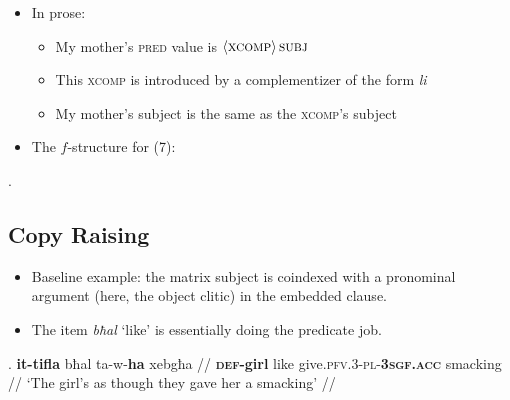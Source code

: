 \documentclass[11pt]{article}
\begin{document}
\begin{itemize}
  \item In prose: \begin{itemize}
      \item My mother's \textsc{pred} value is $\left\langle \textsc{xcomp} \right\rangle \textsc{subj}$
      \item This \textsc{xcomp} is introduced by a complementizer of the form \textit{li}
      \item My mother's subject is the same as the \textsc{xcomp}'s subject
    \end{itemize}

  \item The \(f\)-structure for (7):
\end{itemize}
\ex. 



\subsection{Copy Raising}

\begin{itemize}
  \item Baseline example: the matrix subject is coindexed with a pronominal argument (here, the object clitic) in the embedded clause.

  \item The item \textit{bħal} `like' is essentially doing the predicate job.
\end{itemize}
\ex. \begingl
\gla \textbf{it-tifla} bħal ta-w-\textbf{ha} xebgħa //
\glb \textbf{\textsc{def}-girl} like give.\textsc{pfv.3-pl-\textbf{3sgf.acc}} smacking //
\glft `The girl's as though they gave her a smacking' //
\endgl
\end{document}

